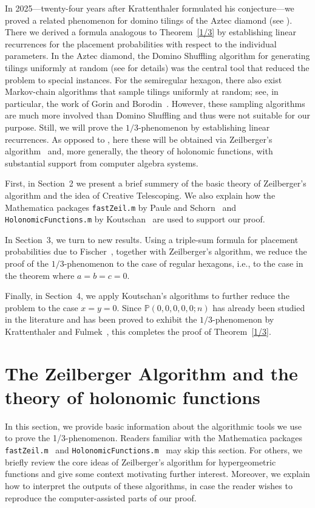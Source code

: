 \documentclass{amsart}
\numberwithin{equation}{section}
\begin{document}
In 2025—twenty-four years after Krattenthaler formulated his conjecture—we proved a related phenomenon for domino tilings of the Aztec diamond (see \cite{1/4}). There we derived a formula analogous to Theorem~\ref{1/3} by establishing linear recurrences for the placement probabilities with respect to the individual parameters. In the Aztec diamond, the Domino Shuffling algorithm for generating tilings uniformly at random (see \cite{Azdiam2,jockusch} for details) was the central tool that reduced the problem to special instances. For the semiregular hexagon, there also exist Markov-chain algorithms that sample tilings uniformly at random; see, in particular, the work of Gorin and Borodin~\cite{hexshuffle}. However, these sampling algorithms are much more involved than Domino Shuffling and thus were not suitable for our purpose. Still, we will prove the $1/3$-phenomenon by establishing linear recurrences. As opposed to \cite{1/4}, here these will be obtained via Zeilberger’s algorithm~\cite{AB} and, more generally, the theory of holonomic functions, with substantial support from computer algebra systems.

First, in Section~2 we present a brief summery of the basic theory of Zeilberger’s algorithm and the idea of Creative Telescoping. We also explain how the Mathematica packages \texttt{fastZeil.m} by Paule and Schorn~\cite{Paule} and \texttt{HolonomicFunctions.m} by Koutschan~\cite{holo,KoutschanThesis,Koutschan} are used to support our proof.  

In Section~3, we turn to new results. Using a triple-sum formula for placement probabilities due to Fischer~\cite{FischerHexaLoch}, together with Zeilberger’s algorithm, we reduce the proof of the $1/3$-phenomenon to the case of regular hexagons, i.e., to the case in the theorem where $a=b=c=0$. 

Finally, in Section~4, we apply Koutschan's algorithms to further reduce the problem to the case $x=y=0$. Since $\mathbb{P}(0,0,0,0,0;n)$ has already been studied in the literature and has been proved to exhibit the $1/3$-phenomenon by Krattenthaler and Fulmek~\cite{CenterCase}, this completes the proof of Theorem~\ref{1/3}.

\section{The Zeilberger Algorithm and the theory of holonomic functions}\label{ZAHA}
In this section, we provide basic information about the algorithmic tools we use to prove the 1/3-phenomenon. Readers familiar with the Mathematica packages \texttt{fastZeil.m}~\cite{Paule} and \texttt{HolonomicFunctions.m}~\cite{holo,KoutschanThesis,Koutschan} may skip this section. For others, we briefly review the core ideas of Zeilberger's algorithm for hypergeometric functions and give some context motivating further interest. Moreover, we explain how to interpret the outputs of these algorithms, in case the reader wishes to reproduce the computer-assisted parts of our proof.
\end{document}
